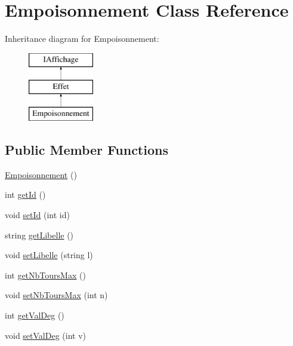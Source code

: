 \hypertarget{class_empoisonnement}{\section{\-Empoisonnement \-Class \-Reference}
\label{class_empoisonnement}
}
\-Inheritance diagram for \-Empoisonnement\-:\begin{figure}[H]
\begin{center}
\leavevmode
\includegraphics[height=3.000000cm]{class_empoisonnement}
\end{center}
\end{figure}
\subsection*{\-Public \-Member \-Functions}
\begin{DoxyCompactItemize}
\item 
\hyperlink{class_empoisonnement_a10f418f15faeaf3f5940234b282f0638}{\-Empoisonnement} ()
\item 
int \hyperlink{class_empoisonnement_aca251add204972489663e8a6a56525ac}{get\-Id} ()
\item 
void \hyperlink{class_empoisonnement_a0bd14f04931bcd9f926036ab2ece8ce6}{set\-Id} (int id)
\item 
string \hyperlink{class_empoisonnement_a787da32b563d6f18bb8307d59bbfb9ec}{get\-Libelle} ()
\item 
void \hyperlink{class_empoisonnement_a0ab7a1e8a917a0f050832819b3804a96}{set\-Libelle} (string l)
\item 
int \hyperlink{class_empoisonnement_a10bcef58e5f423cf1b957591787fb157}{get\-Nb\-Tours\-Max} ()
\item 
void \hyperlink{class_empoisonnement_a52a3cc1746ccacb1c29e6bd8a2aecf94}{set\-Nb\-Tours\-Max} (int n)
\item 
int \hyperlink{class_empoisonnement_a4ba692ca3d6fd64653471c6a757c1701}{get\-Val\-Deg} ()
\item 
void \hyperlink{class_empoisonnement_a15b5148b3e38af152c74f4fe5bf85c6c}{set\-Val\-Deg} (int v)
\end{DoxyCompactItemize}


